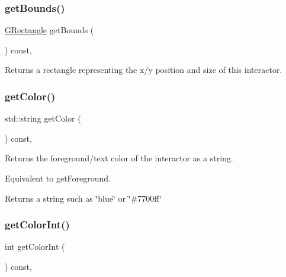 \subsubsection{\texorpdfstring{get\+Bounds()}{getBounds()}}
{\footnotesize\ttfamily \mbox{\hyperlink{structGRectangle}{G\+Rectangle}} get\+Bounds (\begin{DoxyParamCaption}{ }\end{DoxyParamCaption}) const\hspace{0.3cm}{\ttfamily [virtual]}, {\ttfamily [inherited]}}



Returns a rectangle representing the x/y position and size of this interactor. 

\mbox{\label{classGInteractor_aa061dfa488c31e18549d64363c1d0e34}} 
\subsubsection{\texorpdfstring{get\+Color()}{getColor()}}
{\footnotesize\ttfamily std\+::string get\+Color (\begin{DoxyParamCaption}{ }\end{DoxyParamCaption}) const\hspace{0.3cm}{\ttfamily [virtual]}, {\ttfamily [inherited]}}



Returns the foreground/text color of the interactor as a string. 

Equivalent to get\+Foreground. \begin{DoxyReturn}{Returns}
a string such as \char`\"{}blue\char`\"{} or \char`\"{}\#7700ff\char`\"{} 
\end{DoxyReturn}
\mbox{\label{classGInteractor_a9635c7af766cdc3417f346683fa0e6c1}} 
\subsubsection{\texorpdfstring{get\+Color\+Int()}{getColorInt()}}
{\footnotesize\ttfamily int get\+Color\+Int (\begin{DoxyParamCaption}{ }\end{DoxyParamCaption}) const\hspace{0.3cm}{\ttfamily [virtual]}, {\ttfamily [inherited]}}



